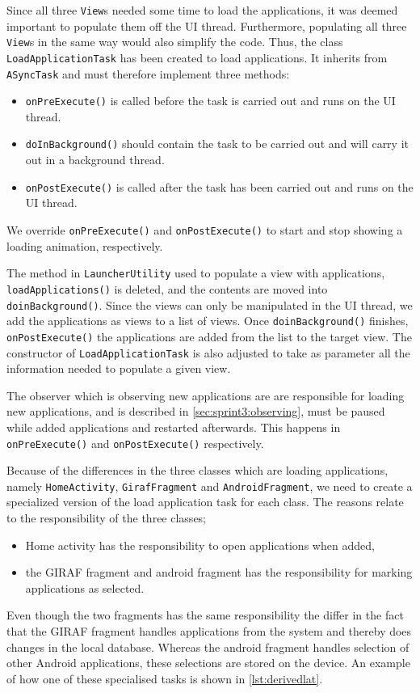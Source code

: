 Since all three \lstinline!View!s needed some time to load the applications, it was deemed important to populate them off the UI thread.
Furthermore, populating all three \lstinline!View!s in the same way would also simplify the code.
Thus, the class \lstinline!LoadApplicationTask! has been created to load applications. 
It inherits from \lstinline!ASyncTask! and must therefore implement three methods:

\begin{itemize}
\item \lstinline!onPreExecute()! is called before the task is carried out and runs on the UI thread.
\item \lstinline!doInBackground()! should contain the task to be carried out and will carry it out in a background thread.
\item \lstinline!onPostExecute()! is called after the task has been carried out and runs on the UI thread.
\end{itemize}

We override \lstinline!onPreExecute()! and \lstinline!onPostExecute()! to start and stop showing a loading animation, respectively.

The method in \lstinline!LauncherUtility! used to populate a view with applications, \lstinline!loadApplications()! is deleted, and the contents are moved into \lstinline!doinBackground()!.
Since the views can only be manipulated in the UI thread, we add the applications as views to a list of views.
Once \lstinline!doinBackground()! finishes, \lstinline!onPostExecute()! the applications are added from the list to the target view. 
The constructor of \lstinline!LoadApplicationTask! is also adjusted to take as parameter all the information needed to populate a given view.

The observer which is observing new applications are are responsible for loading new applications, and is described in \cref{sec:sprint3:observing}, must be paused while added applications and restarted afterwards.
This happens in \lstinline!onPreExecute()! and \lstinline!onPostExecute()! respectively.

Because of the differences in the three classes which are loading applications, namely \lstinline!HomeActivity!, \lstinline!GirafFragment! and \lstinline!AndroidFragment!, we need to create a specialized version of the load application task for each class.
The reasons relate to the responsibility of the three classes;
\begin{itemize}
	\item Home activity has the responsibility to open applications when added,
	\item the GIRAF fragment and android fragment has the responsibility for marking applications as selected.
\end{itemize}
Even though the two fragments has the same responsibility the differ in the fact that the GIRAF fragment handles applications from the \giraf system and thereby does changes in the local database.
Whereas the android fragment handles selection of other Android applications, these selections are stored on the device.
An example of how one of these specialised tasks is shown in \cref{lst:derivedlat}.

